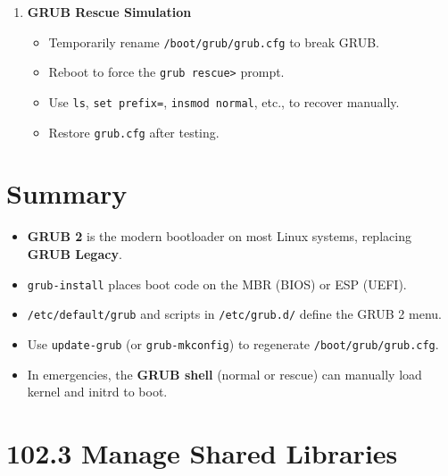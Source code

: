 \documentclass[12pt,a4paper]{report}
\begin{document}
\begin{enumerate}
    \item \textbf{GRUB Rescue Simulation}
    \begin{itemize}
        \item Temporarily rename \texttt{/boot/grub/grub.cfg} to break GRUB.
        \item Reboot to force the \texttt{grub rescue>} prompt.
        \item Use \texttt{ls}, \texttt{set prefix=}, \texttt{insmod normal}, etc., to recover manually.
        \item Restore \texttt{grub.cfg} after testing.
    \end{itemize}
\end{enumerate}

\section*{Summary}

\begin{itemize}
    \item \textbf{GRUB 2} is the modern bootloader on most Linux systems, replacing \textbf{GRUB Legacy}.
    \item \texttt{grub-install} places boot code on the MBR (BIOS) or ESP (UEFI).
    \item \texttt{/etc/default/grub} and scripts in \texttt{/etc/grub.d/} define the GRUB 2 menu.
    \item Use \texttt{update-grub} (or \texttt{grub-mkconfig}) to regenerate \texttt{/boot/grub/grub.cfg}.
    \item In emergencies, the \textbf{GRUB shell} (normal or rescue) can manually load kernel and initrd to boot.
\end{itemize}










\newpage

\section*{102.3 Manage Shared Libraries}
\end{document}
